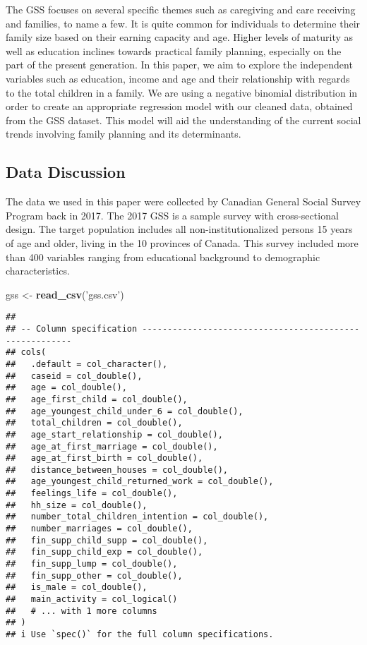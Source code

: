 \documentclass[
]{article}
\newenvironment{Shaded}{\begin{snugshade}}{\end{snugshade}}
\newcommand{\KeywordTok}[1]{\textcolor[rgb]{0.13,0.29,0.53}{\textbf{#1}}}
\newcommand{\NormalTok}[1]{#1}
\newcommand{\StringTok}[1]{\textcolor[rgb]{0.31,0.60,0.02}{#1}}
\begin{document}
The GSS focuses on several specific themes such as caregiving and care
receiving and families, to name a few. It is quite common for
individuals to determine their family size based on their earning
capacity and age. Higher levels of maturity as well as education
inclines towards practical family planning, especially on the part of
the present generation. In this paper, we aim to explore the independent
variables such as education, income and age and their relationship with
regards to the total children in a family. We are using a negative
binomial distribution in order to create an appropriate regression model
with our cleaned data, obtained from the GSS dataset. This model will
aid the understanding of the current social trends involving family
planning and its determinants.

\hypertarget{data-discussion}{%
\subsection{Data Discussion}\label{data-discussion}}

The data we used in this paper were collected by Canadian General Social
Survey Program back in 2017. The 2017 GSS is a sample survey with
cross-sectional design. The target population includes all
non-institutionalized persons 15 years of age and older, living in the
10 provinces of Canada. This survey included more than 400 variables
ranging from educational background to demographic characteristics.

\begin{Shaded}
\begin{Highlighting}[]
\NormalTok{gss <-}\StringTok{ }\KeywordTok{read_csv}\NormalTok{(}\StringTok{'gss.csv'}\NormalTok{)}
\end{Highlighting}
\end{Shaded}

\begin{verbatim}
## 
## -- Column specification --------------------------------------------------------
## cols(
##   .default = col_character(),
##   caseid = col_double(),
##   age = col_double(),
##   age_first_child = col_double(),
##   age_youngest_child_under_6 = col_double(),
##   total_children = col_double(),
##   age_start_relationship = col_double(),
##   age_at_first_marriage = col_double(),
##   age_at_first_birth = col_double(),
##   distance_between_houses = col_double(),
##   age_youngest_child_returned_work = col_double(),
##   feelings_life = col_double(),
##   hh_size = col_double(),
##   number_total_children_intention = col_double(),
##   number_marriages = col_double(),
##   fin_supp_child_supp = col_double(),
##   fin_supp_child_exp = col_double(),
##   fin_supp_lump = col_double(),
##   fin_supp_other = col_double(),
##   is_male = col_double(),
##   main_activity = col_logical()
##   # ... with 1 more columns
## )
## i Use `spec()` for the full column specifications.
\end{verbatim}
\end{document}

